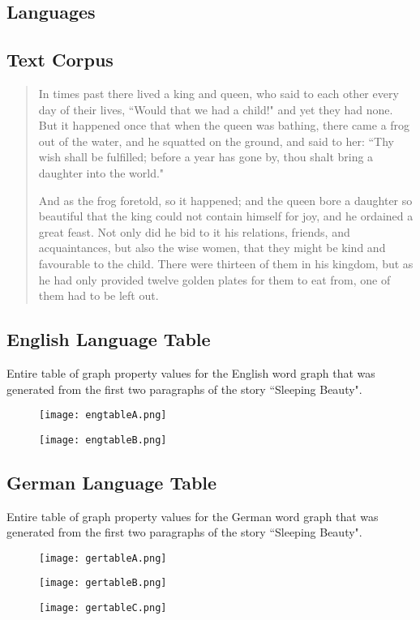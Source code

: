 \begin{appendices}
\chapter{Languages}\label{app:Languages}
\section{Text Corpus}\label{textcorpus}
\begin{quote}
In times past there lived a king and queen, who said to each other every day of their lives, ``Would that we had a child!" and yet they had none. But it happened once that when the queen was bathing, there came a frog out of the water, and he squatted on the ground, and said to her: ``Thy wish shall be fulfilled; before a year has gone by, thou shalt bring a daughter into the world."

And as the frog foretold, so it happened; and the queen bore a daughter so beautiful that the king could not contain himself for joy, and he ordained a great feast. Not only did he bid to it his relations, friends, and acquaintances, but also the wise women, that they might be kind and favourable to the child. There were thirteen of them in his kingdom, but as he had only provided twelve golden plates for them to eat from, one of them had to be left out.
\end{quote}

\section{English Language Table}\label{app:engtable}
Entire table of graph property values for the English word graph that was generated from the first two paragraphs of the story ``Sleeping Beauty".
\begin{figure}[H]
	\centering
	\texttt{[image: engtableA.png]}
\end{figure}
\begin{figure}[H]
	\centering
	\texttt{[image: engtableB.png]}
\end{figure}

\section{German Language Table}\label{app:gertable}
Entire table of graph property values for the German word graph that was generated from the first two paragraphs of the story ``Sleeping Beauty".
\begin{figure}[H]
	\centering
	\texttt{[image: gertableA.png]}
\end{figure}
\begin{figure}[H]
	\centering
	\texttt{[image: gertableB.png]}
\end{figure}
\begin{figure}[H]
	\centering
	\texttt{[image: gertableC.png]}
\end{figure}


\end{appendices}
